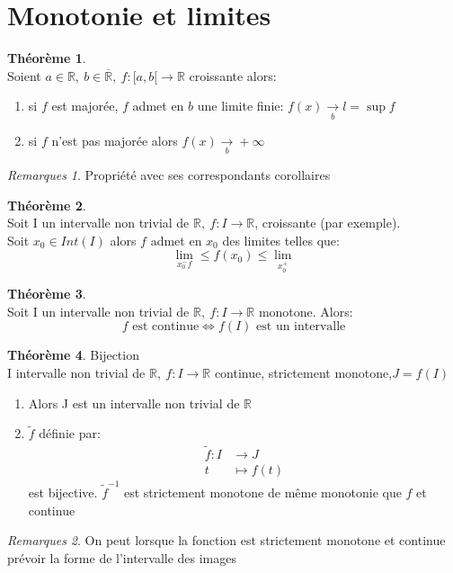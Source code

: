 \documentclass[fleqn]{article}
\theoremstyle{definition} \newtheorem*{defi}{D\'efinition}
\theoremstyle{definition} \newtheorem*{theo}{Th\'eor\`eme}
\theoremstyle{definition} \newtheorem*{prop}{Propri\'et\'e}
\theoremstyle{remark} \newtheorem*{rqs}{Remarques}
\begin{document}
\section{Monotonie et limites}

\begin{theo} $ $ \\
	Soient $a \in \mathbb{R},\ b \in \overline{\mathbb{R}},\ f:[a,b[ \rightarrow \mathbb{R}$ croissante alors:
	\begin{enumerate}
		\item si $f$ est major\'ee, $f$ admet en $b$ une limite finie: $f(x) \underset{b}{\rightarrow} l = \sup f$
		\item si $f$ n'est pas major\'ee alors $f(x) \underset{b}{\rightarrow} +\infty$
	\end{enumerate}
	\begin{rqs}
		Propri\'et\'e avec ses correspondants corollaires
	\end{rqs}
\end{theo}

\begin{theo} $ $ \\
	Soit I un intervalle non trivial de $\mathbb{R},\ f:I \rightarrow \mathbb{R}$, croissante (par exemple). \\
	Soit $x_0 \in Int(I)$ alors $f$ admet en $x_0$ des limites telles que:
	\[\lim_{x_0^- f} \leq f(x_0) \leq \lim_{x_0^+}\]
\end{theo}

\begin{theo} $ $ \\
	Soit I un intervalle non trivial de $\mathbb{R},\ f:I\rightarrow \mathbb{R}$ monotone. Alors:
	\[f \text{ est continue} \Leftrightarrow f(I) \text{ est un intervalle}\]
\end{theo}

\begin{theo} Bijection \\
	I intervalle non trivial de $\mathbb{R},\ f:I\rightarrow \mathbb{R}$ continue, strictement monotone,$J = f(I)$
	\begin{enumerate}
		\item Alors J est un intervalle non trivial de $\mathbb{R}$
		\item $\tilde{f}$ d\'efinie par:
			\begin{align*}
				\tilde{f}: I &\rightarrow J \\
				t &\mapsto f(t)
			\end{align*}
			est bijective. $\tilde{f}^{-1}$ est strictement monotone de m\^eme monotonie que $f$ et continue
	\end{enumerate}
	\begin{rqs}
		On peut lorsque la fonction est strictement monotone et continue pr\'evoir la forme de l'intervalle des images
	\end{rqs}
\end{theo}
\end{document}
